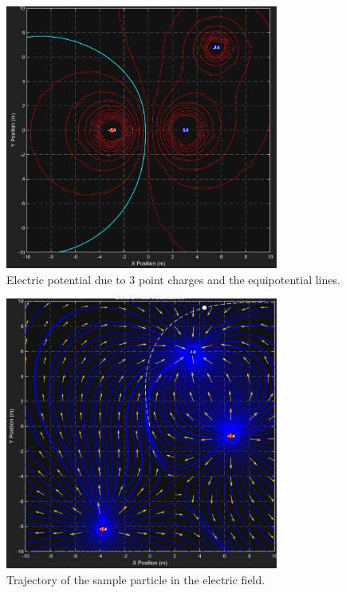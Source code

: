 \documentclass[12pt,a4paper]{article}
\begin{document}
\begin{figure}[H]
    \centering
    \includegraphics[width=0.8\textwidth]{../results/img/potential.png}
    \caption{Electric potential due to 3 point charges and the equipotential lines.}
\end{figure}


\begin{figure}[H]
    \centering
    \includegraphics[width=0.8\textwidth]{../results/img/trajectory.png}
    \caption{Trajectory of the sample particle in the electric field.}
\end{figure}
\end{document}
